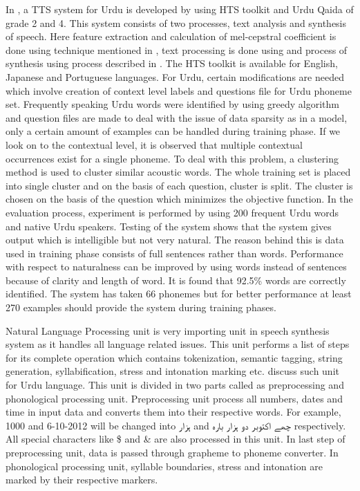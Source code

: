 In \cite{nawaz2014hidden}, a TTS system for Urdu is developed by using HTS toolkit and Urdu Qaida of grade 2 and 4. This system consists of two processes, text analysis and synthesis of speech. Here feature extraction and calculation of mel-cepstral coefficient is done using technique mentioned in \cite{fukada1992adaptive}, text processing is done using \cite{kabir2002natural} and process of synthesis using process described in \cite{tokuda2000speech}. The HTS toolkit is available for English, Japanese and Portuguese languages. For Urdu, certain modifications are needed which involve creation of context level labels and questions file for Urdu phoneme set. Frequently speaking Urdu words were identified by using greedy algorithm and question files are made to deal with the issue of data sparsity as in a model, only a certain amount of examples can be handled during training phase. If we look on to the contextual level, it is observed that multiple contextual occurrences exist for a single phoneme. To deal with this problem, a clustering method is used to cluster similar acoustic words. The whole training set is placed into single cluster and on the basis of each question, cluster is split. The cluster is chosen on the basis of the question which minimizes the objective function. In the evaluation process, experiment is performed by using 200 frequent Urdu words and native Urdu speakers. Testing of the system shows that the system gives output which is intelligible but not very natural. The reason behind this is data used in training phase consists of full sentences rather than words. Performance with respect to naturalness can be improved by using words instead of sentences because of clarity and length of word. It is found that 92.5\% words are correctly identified. The system has taken 66 phonemes but for better performance at least 270 examples should provide the system during training phases.

Natural Language Processing unit is very importing unit in speech synthesis system as it handles all language related issues. This unit performs a list of steps for its complete operation which contains tokenization, semantic tagging, string generation, syllabification, stress and intonation marking etc. \cite{saleem2002urdu, urdu_text_preprocessing} discuss such unit for Urdu language. This unit is divided in two parts called as preprocessing and phonological processing unit. Preprocessing unit process all numbers, dates and time in input data and converts them into their respective words. For example, 1000 and 6-10-2012 will be changed into \texturdu{ہزار} and \texturdu{چھے اکتوبر دو ہزار بارہ} respectively. All special characters like \$ and & are also processed in this unit. In last step of preprocessing unit, data is passed through grapheme to phoneme converter. In phonological processing unit, syllable boundaries, stress and intonation are marked by their respective markers.


